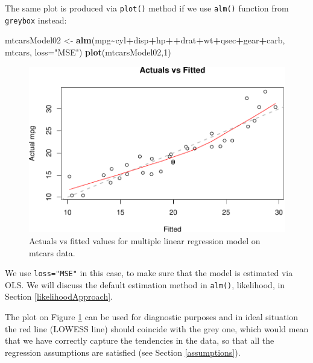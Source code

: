 \documentclass[
]{book}
\newenvironment{Shaded}{\begin{snugshade}}{\end{snugshade}}
\newcommand{\DataTypeTok}[1]{\textcolor[rgb]{0.13,0.29,0.53}{#1}}
\newcommand{\DecValTok}[1]{\textcolor[rgb]{0.00,0.00,0.81}{#1}}
\newcommand{\KeywordTok}[1]{\textcolor[rgb]{0.13,0.29,0.53}{\textbf{#1}}}
\newcommand{\NormalTok}[1]{#1}
\newcommand{\OperatorTok}[1]{\textcolor[rgb]{0.81,0.36,0.00}{\textbf{#1}}}
\newcommand{\StringTok}[1]{\textcolor[rgb]{0.31,0.60,0.02}{#1}}
\theoremstyle{definition}
\theoremstyle{definition}
\theoremstyle{definition}
\theoremstyle{definition}
\theoremstyle{remark}
\begin{document}
The same plot is produced via \texttt{plot()} method if we use \texttt{alm()} function from \texttt{greybox} instead:

\begin{Shaded}
\begin{Highlighting}[]
\NormalTok{mtcarsModel02 \textless{}{-}}\StringTok{ }\KeywordTok{alm}\NormalTok{(mpg}\OperatorTok{\textasciitilde{}}\NormalTok{cyl}\OperatorTok{+}\NormalTok{disp}\OperatorTok{+}\NormalTok{hp}\OperatorTok{++}\NormalTok{drat}\OperatorTok{+}\NormalTok{wt}\OperatorTok{+}\NormalTok{qsec}\OperatorTok{+}\NormalTok{gear}\OperatorTok{+}\NormalTok{carb, mtcars, }\DataTypeTok{loss=}\StringTok{"MSE"}\NormalTok{)}
\KeywordTok{plot}\NormalTok{(mtcarsModel02,}\DecValTok{1}\NormalTok{)}
\end{Highlighting}
\end{Shaded}

\begin{figure}
\centering
\includegraphics{Svetunkov---Statistics-for-Business-Analytics_files/figure-latex/mtcarsModel02Plot-1.pdf}
\caption{\label{fig:mtcarsModel02Plot}Actuals vs fitted values for multiple linear regression model on mtcars data.}
\end{figure}

We use \texttt{loss="MSE"} in this case, to make sure that the model is estimated via OLS. We will discuss the default estimation method in \texttt{alm()}, likelihood, in Section \ref{likelihoodApproach}.

The plot on Figure \ref{fig:mtcarsModel02Plot} can be used for diagnostic purposes and in ideal situation the red line (LOWESS line) should coincide with the grey one, which would mean that we have correctly capture the tendencies in the data, so that all the regression assumptions are satisfied (see Section \ref{assumptions}).
\end{document}
